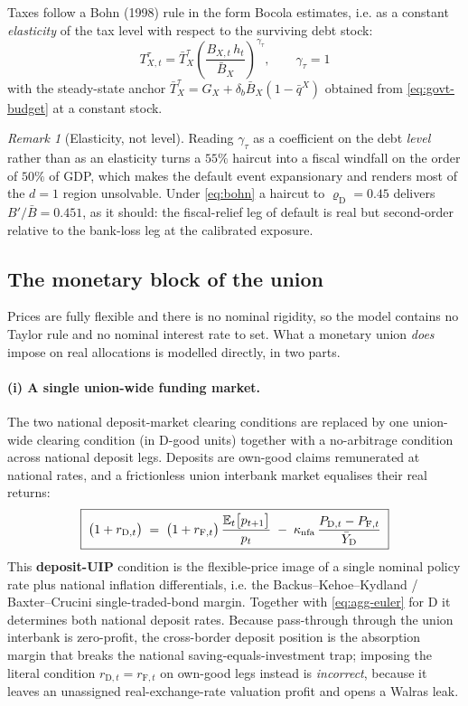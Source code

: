 \documentclass[11pt]{article}
\numberwithin{equation}{section}
\newcommand{\E}{\mathbb{E}}
\newcommand{\D}{\mathrm{D}}
\newcommand{\F}{\mathrm{F}}
\theoremstyle{definition}
\theoremstyle{plain}
\theoremstyle{remark}
\newtheorem{remark}{Remark}
\begin{document}
Taxes follow a Bohn (1998) rule in the form Bocola estimates, i.e. as a constant
\emph{elasticity} of the tax level with respect to the surviving debt stock:
\begin{equation}
\boxed{\;
T^{\tau}_{X,t}=\bar T^{\tau}_X
\left(\frac{B_{X,t}\,h_t}{\bar B_X}\right)^{\gamma_\tau},
\qquad \gamma_\tau=1 \;}
\label{eq:bohn}
\end{equation}
with the steady-state anchor $\bar T^{\tau}_X=G_X+\delta_b\bar B_X(1-\bar q^{X})$
obtained from \eqref{eq:govt-budget} at a constant stock.

\begin{remark}[Elasticity, not level]
Reading $\gamma_\tau$ as a coefficient on the debt \emph{level} rather than as an
elasticity turns a $55\%$ haircut into a fiscal windfall on the order of $50\%$ of
GDP, which makes the default event expansionary and renders most of the $d=1$ region
unsolvable. Under \eqref{eq:bohn} a haircut to $\varrho_\D=0.45$ delivers
$B'/\bar B=0.451$, as it should: the fiscal-relief leg of default is real but
second-order relative to the bank-loss leg at the calibrated exposure.
\end{remark}

\subsection{The monetary block of the union}
\label{sec:money}

Prices are fully flexible and there is no nominal rigidity, so the model contains no
Taylor rule and no nominal interest rate to set. What a monetary union \emph{does}
impose on real allocations is modelled directly, in two parts.

\paragraph{(i) A single union-wide funding market.} The two national deposit-market
clearing conditions are replaced by one union-wide clearing condition (in $\D$-good
units) together with a no-arbitrage condition across national deposit legs. Deposits
are own-good claims remunerated at national rates, and a frictionless union interbank
market equalises their real returns:
\begin{equation}
\boxed{\;
\bigl(1+r_{\D,t}\bigr)
\;=\;\bigl(1+r_{\F,t}\bigr)\,\frac{\E_t\bigl[p_{t+1}\bigr]}{p_t}
\;-\;\kappa_{\rm nfa}\,\frac{P_{\D,t}-P_{\F,t}}{\bar Y_\D}\;}
\label{eq:uip}
\end{equation}
This \textbf{deposit-UIP} condition is the flexible-price image of a single nominal
policy rate plus national inflation differentials, i.e. the Backus--Kehoe--Kydland /
Baxter--Crucini single-traded-bond margin. Together with \eqref{eq:agg-euler} for
$\D$ it determines both national deposit rates. Because pass-through through the
union interbank is zero-profit, the cross-border deposit position is the absorption
margin that breaks the national saving-equals-investment trap; imposing the literal
condition $r_{\D,t}=r_{\F,t}$ on own-good legs instead is \emph{incorrect}, because
it leaves an unassigned real-exchange-rate valuation profit and opens a Walras leak.
\end{document}
